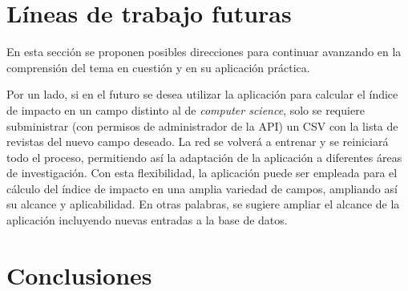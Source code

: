 


\section{Líneas de trabajo futuras}
En esta sección se proponen posibles direcciones para continuar avanzando en la comprensión del tema en cuestión y en su aplicación práctica.

Por un lado, si en el futuro se desea utilizar la aplicación para calcular el índice de impacto en un campo distinto al de \textit{computer science}, solo se requiere subministrar (con permisos de administrador de la API) un CSV con la lista de revistas del nuevo campo deseado. La red se volverá a entrenar y se reiniciará todo el proceso, permitiendo así la adaptación de la aplicación a diferentes áreas de investigación. Con esta flexibilidad, la aplicación puede ser empleada para el cálculo del índice de impacto en una amplia variedad de campos, ampliando así su alcance y aplicabilidad. 
En otras palabras, se sugiere ampliar el alcance de la aplicación incluyendo nuevas entradas a la base de datos.


\section{Conclusiones}




